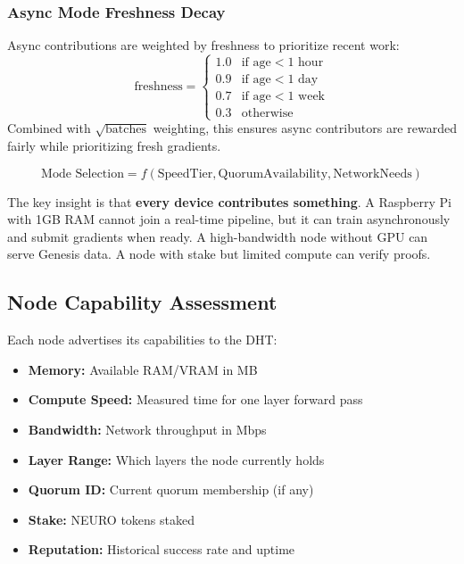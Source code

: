 \documentclass[11pt,a4paper]{article}
\begin{document}
\subsubsection{Async Mode Freshness Decay}
Async contributions are weighted by freshness to prioritize recent work:
\begin{equation}
\text{freshness} = \begin{cases}
1.0 & \text{if age} < 1\text{ hour} \\
0.9 & \text{if age} < 1\text{ day} \\
0.7 & \text{if age} < 1\text{ week} \\
0.3 & \text{otherwise}
\end{cases}
\end{equation}
Combined with $\sqrt{\text{batches}}$ weighting, this ensures async contributors are rewarded fairly while prioritizing fresh gradients.

\begin{equation}
\text{Mode Selection} = f(\text{SpeedTier}, \text{QuorumAvailability}, \text{NetworkNeeds})
\end{equation}

The key insight is that \textbf{every device contributes something}. A Raspberry Pi with 1GB RAM cannot join a real-time pipeline, but it can train asynchronously and submit gradients when ready. A high-bandwidth node without GPU can serve Genesis data. A node with stake but limited compute can verify proofs.

\subsection{Node Capability Assessment}

Each node advertises its capabilities to the DHT:

\begin{itemize}
    \item \textbf{Memory:} Available RAM/VRAM in MB
    \item \textbf{Compute Speed:} Measured time for one layer forward pass
    \item \textbf{Bandwidth:} Network throughput in Mbps
    \item \textbf{Layer Range:} Which layers the node currently holds
    \item \textbf{Quorum ID:} Current quorum membership (if any)
    \item \textbf{Stake:} NEURO tokens staked
    \item \textbf{Reputation:} Historical success rate and uptime
\end{itemize}
\end{document}
